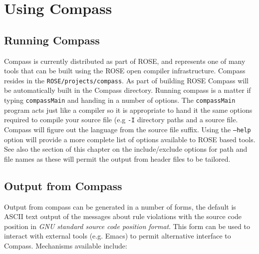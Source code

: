 \chapter{Using Compass}

\section{Running Compass}

    Compass is currently distributed as part of ROSE, and represents one
of many tools that can be built using the ROSE open compiler infrastructure.
Compass resides in the {\tt ROSE/projects/compass}.  As part of building ROSE
Compass will be automatically built in the Compass directory.  Running compass
is a matter if typing {\tt compassMain} and handing in a number of options.
The {\tt compassMain} program acts just like a compiler so it is appropriate
to hand it the same options required to compile your source file (e.g {\tt -I}
directory paths and a source file.  Compass will figure out the language from
the source file suffix.  Using the {\tt --help} option will provide a more
complete list of options available to ROSE based tools.  See also the section
of this chapter on the include/exclude options for path and file names as
these will permit the output from header files to be tailored.


\section{Output from Compass}

   Output from compass can be generated in a number of forms, the default is
ASCII text output of the messages about rule violations with the source code
position in {\it GNU standard source code position format}.  This form can be
used to interact with external tools (e.g. Emacs) to permit alternative
interface to Compass.  Mechanisms available include:

